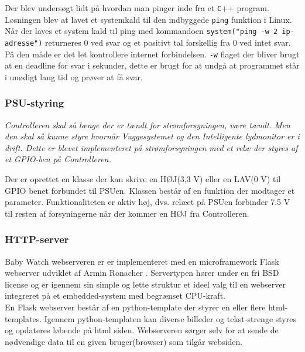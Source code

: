 Der blev undersøgt lidt på hvordan man pinger inde fra et \verb+C+++ program. Løsningen blev at lavet et systemkald til den indbyggede \verb+ping+ funktion i Linux. Når der laves et system kald til ping med kommandoen \verb+system("ping -w 2 ip-adresse")+ returneres 0 ved svar og et positivt tal forskellig fra 0 ved intet svar. På den måde er det let kontrollere internet forbindelsen. \verb+-w+ flaget der bliver brugt at en deadline for svar i sekunder, dette er brugt for at undgå at programmet står i unødigt lang tid og prøver at få svar.

\subsubsection*{PSU-styring}

\textit{Controlleren skal så længe der er tændt for strømforsyningen, være tændt. Men den skal så kunne styre hvornår Vuggesystemet og den Intelligente lydmonitor er i drift. Dette er blevet implementeret på strømforsyningen med et relæ der styres af et GPIO-ben på Controlleren.}

Der er oprettet en klasse der kan skrive en HØJ(3,3 V) eller en LAV(0 V) til GPIO benet forbundet til PSUen. Klassen består af en funktion der modtager et parameter. Funktionaliteten er aktiv høj, dvs. relæet på PSUen forbinder 7.5 V til resten af forsyningerne når der kommer en HØJ fra Controlleren.

\subsubsection*{HTTP-server}

Baby Watch webserveren er er implementeret med en microframework Flask  webserver udviklet af Armin Ronacher \citep{website:flask}. Servertypen hører under en fri BSD license \citep{website:BCD} og er igennem sin simple og lette struktur et ideel valg til en webserver integreret på et embedded-system med begrænset CPU-kraft. \\
En Flask webserver består af en python-template der styrer en eller flere html-templates. Igennem python-templaten kan diverse billeder og tekst-strenge styres og opdateres løbende på html siden. Webserveren sørger selv for at sende de nødvendige data til en given bruger(browser) som tilgår websiden. 


